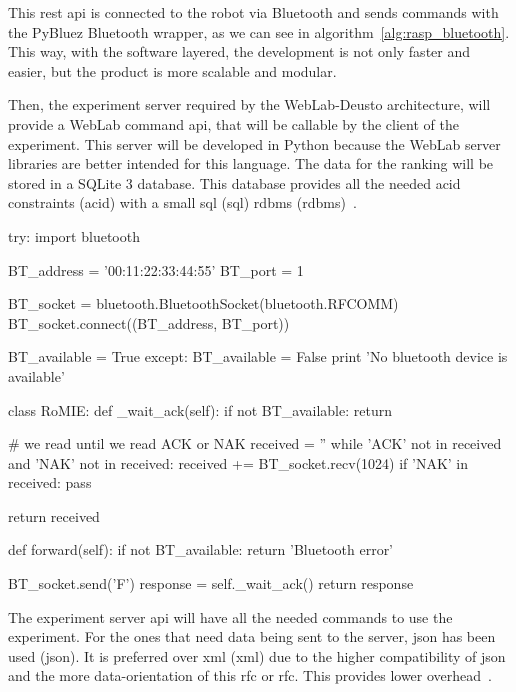 This \acrshort{rest} \acrshort{api} is connected to the robot via Bluetooth and sends commands with
the PyBluez Bluetooth wrapper, as we can see in algorithm~\ref{alg:rasp_bluetooth}. This way, with
the software layered, the development is not only faster and easier, but the product is more
scalable and modular.

Then, the experiment server required by the WebLab-Deusto architecture, will provide a WebLab
command \acrshort{api}, that will be callable by the client of the experiment. This server will be
developed in Python because the WebLab server libraries are better intended for this language. The
data for the ranking will be stored in a SQLite 3 database. This database provides all the needed
\acrshort{acid} constraints (\acrlong{acid}) with a small \acrshort{sql} (\acrlong{sql})
\acrlong{rdbms} (\acrshort{rdbms})~\cite{sqlite}.

\begin{center}
\begin{minipage}{.9\textwidth}
\singlespace
{}
\begin{pyglist}[language=python, caption={Bluetooth connection example.},
	label={alg:rasp_bluetooth}, listingname={Algorithm}, numbers=left]
try:
    import bluetooth

    BT_address = '00:11:22:33:44:55'
    BT_port = 1

    BT_socket = bluetooth.BluetoothSocket(bluetooth.RFCOMM)
    BT_socket.connect((BT_address, BT_port))

    BT_available = True
except:
    BT_available = False
    print 'No bluetooth device is available'

class RoMIE:
    def _wait_ack(self):
        if not BT_available: return

        # we read until we read ACK or NAK
        received = ''
        while 'ACK' not in received and 'NAK' not in received:
            received += BT_socket.recv(1024)
        if 'NAK' in received:
            pass

        return received

    def forward(self):
        if not BT_available: return 'Bluetooth error'

        BT_socket.send('F')
        response = self._wait_ack()
        return response
\end{pyglist}
\end{minipage}
\end{center}

The experiment server \acrshort{api} will have all the needed commands to use the experiment. For
the ones that need data being sent to the server, \acrshort{json} has been used (\acrlong{json}). It
is preferred over \acrshort{xml} (\acrlong{xml}) due to the higher compatibility of \acrshort{json}
and the more data-orientation of this \acrlong{rfc} or \acrshort{rfc}. This provides lower
overhead~\cite{xml_vs_json}.

